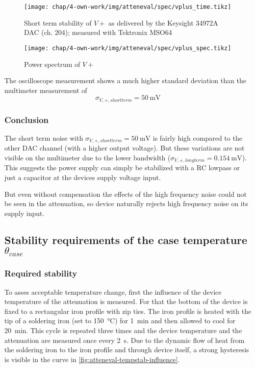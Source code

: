 \begin{figure}[tb]
	\centering
	\texttt{[image: chap/4-own-work/img/atteneval/spec/vplus\_time.tikz]}
	\caption{Short term stability of $V+$ as delivered by the Keysight 34972A DAC (ch. 204); measured with Tektronix MSO64}
	\label{fig:atteneval-vsuppstab-shorttermTime}
\end{figure}

\begin{figure}[tb]
	\centering
	\texttt{[image: chap/4-own-work/img/atteneval/spec/vplus\_spec.tikz]}
	\caption{Power spectrum of $V+$}
	\label{fig:atteneval-vsuppstab-shorttermSpec}
\end{figure}

The oscilloscope measurement shows a much higher standard deviation than the multimeter measurement of
\begin{equation}
\sigma_{V,+,shortterm} = \SI{50}{\milli\volt}
\end{equation}

\FloatBarrier
\subsubsection{Conclusion}
The short term noise with $\sigma_{V,+,shortterm} = \SI{50}{\milli\volt}$ is fairly high compared to the other DAC channel (with a higher output voltage). But these variations are not visible on the multimeter due to the lower bandwidth ($\sigma_{V,+,longterm} = \SI{0.154}{\milli\volt}$). This suggests the power supply can simply be stabilized with a RC lowpass or just a capacitor at the devices supply voltage input.

But even without compensation the effects of the high frequency noise could not be seen in the attenuation, so device naturally rejects high frequency noise on its supply input.

\FloatBarrier
\subsection{Stability requirements of the case temperature $\theta_{case}$}
\subsubsection{Required stability}
To asses acceptable temperature change, first the influence of the device temperature of the attenuation is measured. For that the bottom of the device is fixed to a rectangular iron profile with zip ties. The iron profile is heated with the tip of a soldering iron (set to \SI{150}{\degreeCelsius}) for \SI{1}{\minute} and then allowed to cool for \SI{20}{\minute}. This cycle is repeated three times and the device temperature and the attenuation are measured once every \SI{2}{\second}. Due to the dynamic flow of heat from the soldering iron to the iron profile and through device itself, a strong hysteresis is visible in the curve in \autoref{fig:atteneval-tempstab-influence}. 

